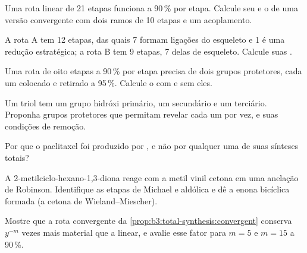 \begin{exercise}[$\star\star$]\label{exo:b3:total-synthesis:5}
Uma rota linear de 21 etapas funciona a 90\,\% por etapa. Calcule seu  e o
de uma versão convergente com dois ramos de 10 etapas e um acoplamento.
\end{exercise}

\begin{exercise}[$\star\star$]\label{exo:b3:total-synthesis:6}
A rota A tem 12 etapas, das quais 7 formam ligações do esqueleto e 1 é uma redução
estratégica; a rota B tem 9 etapas, 7 delas de esqueleto. Calcule suas .
\end{exercise}

\begin{exercise}[$\star\star$]\label{exo:b3:total-synthesis:7}
Uma rota de oito etapas a 90\,\% por etapa precisa de dois grupos protetores, cada um colocado e
retirado a 95\,\%. Calcule o  com e sem eles.
\end{exercise}

\begin{exercise}[$\star\star$]\label{exo:b3:total-synthesis:8}
Um triol tem um grupo hidróxi primário, um secundário e um terciário. Proponha
grupos protetores que permitam revelar cada um por vez, e suas condições de
remoção.
\end{exercise}

\begin{exercise}[$\star\star$]\label{exo:b3:total-synthesis:9}
Por que o paclitaxel foi produzido por , e não por qualquer uma de suas sínteses
totais?
\end{exercise}

\begin{exercise}[$\star\star\star$]\label{exo:b3:total-synthesis:10}
A 2-metilciclo-hexano-1,3-diona reage com a metil vinil cetona em uma anelação de
Robinson. Identifique as etapas de Michael e aldólica e dê a enona bicíclica
formada (a cetona de Wieland--Miescher).
\end{exercise}

\begin{exercise}[$\star\star\star$]\label{exo:b3:total-synthesis:11}
Mostre que a rota convergente da \cref{prop:b3:total-synthesis:convergent} conserva
$y^{-m}$ vezes mais material que a linear, e avalie esse fator para $m = 5$ e
$m = 15$ a 90\,\%.
\end{exercise}

